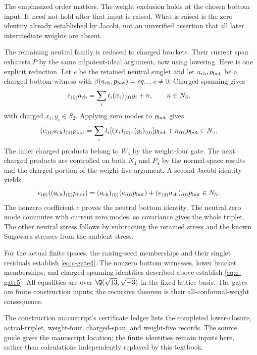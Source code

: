 The emphasized order matters. The weight exclusion holds at the chosen
bottom input. It need not hold after that input is raised. What is
raised is the zero identity already established by Jacobi, not an
unverified assertion that all later intermediate weights are absent.

The remaining neutral family is reduced to charged brackets. Their
current span exhausts $P$ by the same nilpotent-ideal argument, now
using lowering. Here is one explicit reduction. Let $e$ be the
retained neutral singlet and let $a_{\rm ch},p_{\rm bot}$ be a
charged bottom witness with
$\beta(a_{\rm ch},p_{\rm bot})=c q_-$, $c\ne0$.
Charged spanning gives
\[
 e_{(0)}a_{\rm ch}
       =\sum_i t_i(x_i)_{(0)}y_i+n,\qquad n\in N_3,
\]
with charged $x_i,y_i\in S_2$. Applying zero modes to
$p_{\rm bot}$ gives
\[
 (e_{(0)}a_{\rm ch})_{(0)}p_{\rm bot}
 =\sum_i t_i[(x_i)_{(0)},(y_i)_{(0)}]p_{\rm bot}
                            +n_{(0)}p_{\rm bot}\in N_5.
\]
The inner charged products belong to $W_4$ by the weight-four
gate. The next charged products are controlled on both $N_4$
and $P_4$ by the normal-space results and the charged portion
of the weight-five argument. A second Jacobi identity yields
\[
 e_{(0)}((a_{\rm ch})_{(0)}p_{\rm bot})
  =(a_{\rm ch})_{(0)}(e_{(0)}p_{\rm bot})
                    +(e_{(0)}a_{\rm ch})_{(0)}p_{\rm bot}\in N_5.
\]
The nonzero coefficient $c$ proves the neutral bottom identity.
The neutral zero mode commutes with current zero modes, so covariance
gives the whole triplet. The other neutral stress follows by
subtracting the retained stress and the known Sugawara stresses
from the ambient stress.

\begin{constructioninput}
For the actual finite spaces, the raising-seed memberships and their
singlet residuals establish \eqref{eq:c-gate4}. The nonzero bottom
witnesses, lower bracket memberships, and charged spanning identities
described above establish \eqref{eq:c-gate5}. All equalities are over
$\Q(\sqrt{13},\sqrt{-3})$ in the fixed lattice basis. The gates are
finite construction inputs; the recursive theorem is their
all-conformal-weight consequence.
\end{constructioninput}
The construction manuscript's certificate ledger lists the completed
lower-closure, actual-triplet, weight-four, charged-span, and
weight-five records. The source guide gives the manuscript location;
the finite identities remain inputs here, rather than calculations
independently replayed by this textbook.

